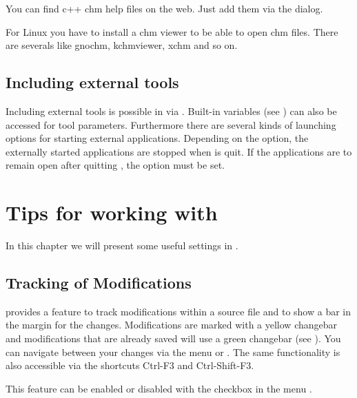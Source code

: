 You can find c++ chm help files on the web. Just add them via the dialog.

For Linux you have to install a chm viewer to be able to open chm files. There are severals like gnochm, kchmviewer, xchm and so on. 

%

\subsection{Including external tools}

Including external tools is possible in \codeblocks via . Built-in variables (see ) can also be accessed for tool parameters. Furthermore there are several kinds of launching options for starting external applications. Depending on the option, the externally started applications are stopped when \codeblocks is quit. If the applications are to remain open after quitting \codeblocks, the option  must be set.

\section{Tips for working with \codeblocks}

In this chapter we will present some useful settings in \codeblocks.

\subsection{Tracking of Modifications}

\codeblocks provides a feature to track modifications within a source file and to show a bar in the margin for the changes. Modifications are marked with a yellow changebar and modifications that are already saved will use a green changebar (see ). You can navigate between your changes via the menu  or . The same functionality is also accessible via the shortcuts Ctrl-F3 and Ctrl-Shift-F3.


This feature can be enabled or disabled with the checkbox  in the menu .


